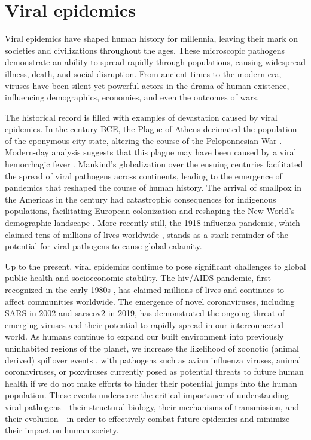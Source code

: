 \section{Viral epidemics}\label{sec:int-viralEpi}
Viral epidemics have shaped human history for millennia, leaving their mark on societies and civilizations throughout the ages.
These microscopic pathogens demonstrate an ability to spread rapidly through populations, causing widespread illness, death, and social disruption.
From ancient times to the modern era, viruses have been silent yet powerful actors in the drama of human existence, influencing demographics, economies, and even the outcomes of wars.

The historical record is filled with examples of devastation caused by viral epidemics.
In the  century BCE, the Plague of Athens decimated the population of the eponymous city-state, altering the course of the Peloponnesian War \citep{thucydides1972history}.
Modern-day analysis suggests that this plague may have been caused by a viral hemorrhagic fever \citep{olson1996thucydides}.
Mankind's globalization over the ensuing centuries facilitated the spread of viral pathogens across continents, leading to the emergence of pandemics that reshaped the course of human history.
The arrival of smallpox in the Americas in the  century \citep{heagerty1928four} had catastrophic consequences for indigenous populations, facilitating European colonization and reshaping the New World's demographic landscape \citep{Patterson2002}.
More recently still, the 1918 influenza pandemic, which claimed tens of millions of lives worldwide \citep{Morens2007}, stands as a stark reminder of the potential for viral pathogens to cause global calamity.

Up to the present, viral epidemics continue to pose significant challenges to global public health and socioeconomic stability.
The \gls{hiv}/AIDS pandemic, first recognized in the early 1980s \citep{Montagnier2002}, has claimed millions of lives and continues to affect communities worldwide.
The emergence of novel coronaviruses, including SARS in 2002 \citep{Zhong2003} and \gls{sarscov2} in 2019, has demonstrated the ongoing threat of emerging viruses and their potential to rapidly spread in our interconnected world.
As humans continue to expand our built environment into previously uninhabited regions of the planet, we increase the likelihood of zoonotic (animal derived) spillover events \citep{Morens2020}, with pathogens such as avian influenza viruses, animal coronaviruses, or poxviruses currently posed as potential threats to future human health if we do not make efforts to hinder their potential jumps into the human population.
These events underscore the critical importance of understanding viral pathogens---their structural biology, their mechanisms of transmission, and their evolution---in order to effectively combat future epidemics and minimize their impact on human society.

